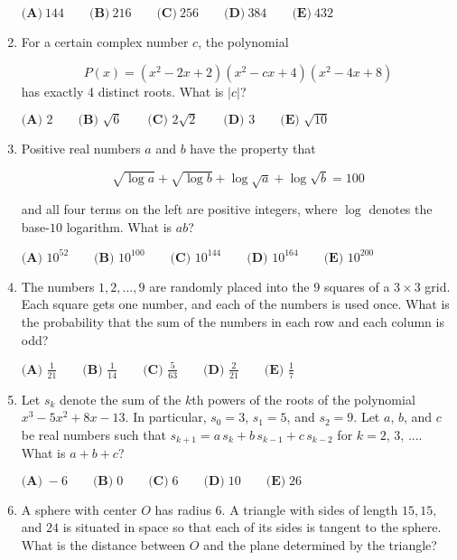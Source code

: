 \documentclass{article}
\begin{document}
\begin{enumerate}[label=\arabic*., itemsep=0.5em]
$\textbf{(A)}\ 144\qquad\textbf{(B)}\ 216\qquad\textbf{(C)}\ 256\qquad\textbf{(D)}\ 384\qquad\textbf{(E)}\ 432$\par \vspace{0.5em}\item For a certain complex number $c$, the polynomial

\begin{equation*}
P(x) = (x^2 - 2x + 2)(x^2 - cx + 4)(x^2 - 4x + 8)
\end{equation*}
has exactly 4 distinct roots. What is $|c|$?

$\textbf{(A) } 2 \qquad \textbf{(B) } \sqrt{6} \qquad \textbf{(C) } 2\sqrt{2} \qquad \textbf{(D) } 3 \qquad \textbf{(E) } \sqrt{10}$\par \vspace{0.5em}\item Positive real numbers $a$ and $b$ have the property that

\begin{equation*}
\sqrt{\log{a}} + \sqrt{\log{b}} + \log \sqrt{a} + \log \sqrt{b} = 100
\end{equation*}


and all four terms on the left are positive integers, where $\log$ denotes the base-$10$ logarithm. What is $ab$?

$\textbf{(A) }   10^{52}   \qquad        \textbf{(B) }   10^{100}   \qquad    \textbf{(C) }   10^{144}   \qquad   \textbf{(D) }  10^{164} \qquad  \textbf{(E) }   10^{200} $\par \vspace{0.5em}\item The numbers $1,2,\dots,9$ are randomly placed into the $9$ squares of a $3 \times 3$ grid. Each square gets one number, and each of the numbers is used once. What is the probability that the sum of the numbers in each row and each column is odd?

$\textbf{(A) }\frac{1}{21}\qquad\textbf{(B) }\frac{1}{14}\qquad\textbf{(C) }\frac{5}{63}\qquad\textbf{(D) }\frac{2}{21}\qquad\textbf{(E) } \frac17$\par \vspace{0.5em}\item Let $s_k$ denote the sum of the $\textit{k}$th powers of the roots of the polynomial $x^3-5x^2+8x-13$. In particular, $s_0=3$, $s_1=5$, and $s_2=9$. Let $a$, $b$, and $c$ be real numbers such that $s_{k+1} = a \, s_k + b \, s_{k-1} + c \, s_{k-2}$ for $k = 2$, $3$, $....$ What is $a+b+c$?

$\textbf{(A)} \; -6 \qquad \textbf{(B)} \; 0 \qquad \textbf{(C)} \; 6 \qquad \textbf{(D)} \; 10 \qquad \textbf{(E)} \; 26$\par \vspace{0.5em}\item A sphere with center $O$ has radius $6$. A triangle with sides of length $15, 15,$ and $24$ is situated in space so that each of its sides is tangent to the sphere. What is the distance between $O$ and the plane determined by the triangle?


\end{enumerate}
\end{document}
